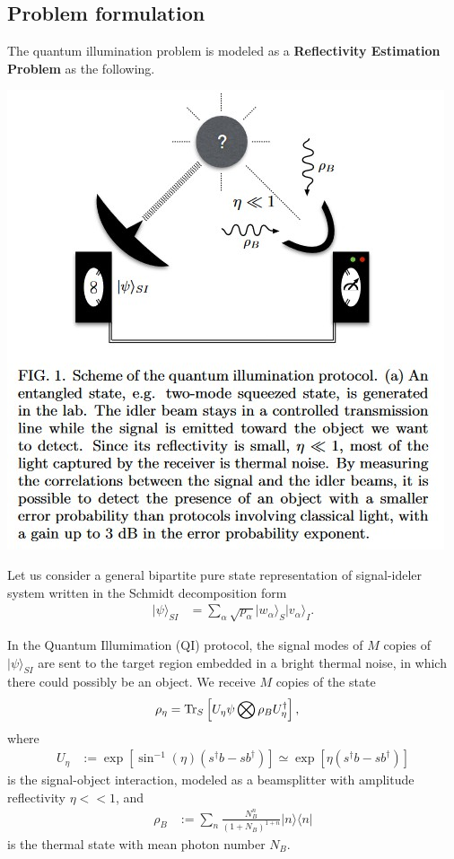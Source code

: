 \documentclass[../../note.tex]{subfiles}
\begin{document}
\subsection{Problem formulation}
The quantum illumination problem is modeled as a \textbf{Reflectivity Estimation Problem} as the following.

\includegraphics[scale=0.8]{chapters/quantum_information_research/quantum illumination.png}

Let us consider a general bipartite pure state representation of signal-ideler system written in the Schmidt decomposition form
\begin{align}
    \vert \psi \rangle_{SI}
    &= \sum_{\alpha} \sqrt{p_{\alpha}} \vert w_{\alpha} \rangle_S \vert v_{\alpha} \rangle_I.
\end{align}

In the Quantum Illumimation (QI) protocol, the signal modes of $M$ copies of $\vert \psi \rangle_{SI}$ are sent to the target region embedded in a bright thermal noise, in which there could possibly be an object. We receive $M$ copies of the state
\begin{align}
    \rho_{\eta}
    &= \operatorname{Tr}_S\left[U_{\eta} \psi \bigotimes \rho_B U_{\eta}^{\dagger}\right],
\end{align}
where 
\begin{align}
    U_{\eta}
    &:= \exp[\sin^{-1}(\eta)(s^\dagger b - s b^\dagger)] \simeq \exp[\eta(s^\dagger b - s b^\dagger)]
    \label{def:U_eta}
\end{align}
is the signal-object interaction, modeled as a beamsplitter with amplitude reflectivity $\eta << 1$, and 
\begin{align}
\label{def: rho_B}
    \rho_B
    &:= \sum_n \frac{N_B^n}{(1+N_B)^{1+n}} \vert n \rangle \langle n \vert
\end{align} 
is the thermal state with mean photon number $N_B$.
\end{document}
